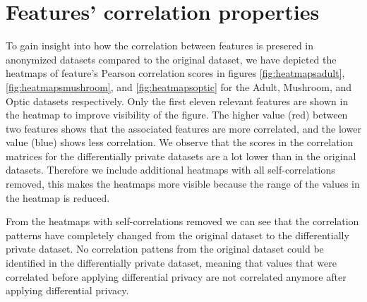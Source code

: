 \section{Features' correlation properties}
To gain insight into how the correlation between features is presered in anonymized datasets compared to the original dataset, we have depicted the heatmaps of feature's Pearson correlation scores in figures \ref{fig:heatmapsadult}, \ref{fig:heatmapsmushroom}, and \ref{fig:heatmapsoptic} for the Adult, Mushroom, and Optic datasets respectively. Only the first eleven relevant features are shown in the heatmap to improve visibility of the figure. The higher value (red) between two features shows that the associated features are more correlated, and the lower value (blue) shows less correlation. We observe that the scores in the correlation matrices for the differentially private datasets are a lot lower than in the original datasets. Therefore we include additional heatmaps with all self-correlations removed, this makes the heatmaps more visible because the range of the values in the heatmap is reduced.

From the heatmaps with self-correlations removed we can see that the correlation patterns have completely changed from the original dataset to the differentially private dataset. No correlation pattens from the original dataset could be identified in the differentially private dataset, meaning that values that were correlated before applying differential privacy are not correlated anymore after applying differential privacy.

